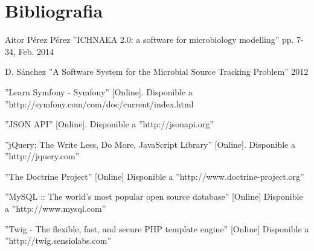\chapter{Bibliografia}
\label{cha:bibliografia}
\begin{thebibliography}{100}
Aitor P\'{e}rez P\'{e}rez ''ICHNAEA 2.0: a software for microbiology modelling'' pp. 7-34, Feb. 2014

D. S\'{a}nchez ''A Software System for the Microbial Source Tracking Problem'' 2012

 ''Learn Symfony - Symfony'' [Online]. Disponible a ''http://symfony.com/com/doc/current/index.html

 ''JSON API''  [Online]. Disponible a ''http://jsonapi.org''

 ''jQuery: The Write Less, Do More, JavaScript Library'' [Online]. Disponible a ''http://jquery.com''

 ''The Doctrine Project'' [Online] Disponible a ''http://www.doctrine-project.org''

 ''MySQL :: The world's most popular open source database'' [Online] Disponible a ''http://www.mysql.com''

 ''Twig - The flexible, fast, and secure PHP template engine''  [Online] Disponible a ''http://twig.sensiolabs.com''
\end{thebibliography}
